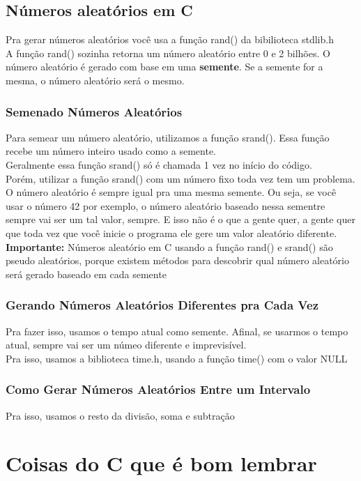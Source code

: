 \documentclass{article}
\begin{document}
\subsection{Números aleatórios em C}
Pra gerar números aleatórios você usa a função rand() da bibilioteca stdlib.h
\\[3pt]
A função rand() sozinha retorna um número aleatório entre 0 e 2 bilhões. O número aleatório é gerado com base em uma \textbf{semente}. Se a semente for a mesma, o número aleatório será o mesmo.

\subsubsection{Semenado Números Aleatórios}
Para semear um número aleatório, utilizamos a função srand(). Essa função recebe um número inteiro usado como a semente. 
\\[3pt]
Geralmente essa função srand() só é chamada 1 vez no início do código. 
\\[3pt]
Porém, utilizar a função srand() com um número fixo toda vez tem um problema. O número aleatório é sempre igual pra uma mesma semente. Ou seja, se você usar o número 42 por exemplo, o número aleatório baseado nessa sementre sempre vai ser um tal valor, sempre. E isso não é o que a gente quer, a gente quer que toda vez que você inicie o programa ele gere um valor aleatório diferente. 
\\[3pt]
\textbf{Importante:} Números aleatório em C usando a função rand() e srand() são pseudo aleatórios, porque existem métodos para descobrir qual número aleatório será gerado baseado em cada semente

\subsubsection{Gerando Números Aleatórios Diferentes pra Cada Vez}
Pra fazer isso, usamos o tempo atual como semente. Afinal, se usarmos o tempo atual, sempre vai ser um númeo diferente e imprevisível.
\\[3pt]
Pra isso, usamos a biblioteca time.h, usando a função time() com o valor NULL

\subsubsection{Como Gerar Números Aleatórios Entre um Intervalo}
Pra isso, usamos o resto da divisão, soma e subtração 

\section{Coisas do C que é bom lembrar}
\end{document}
